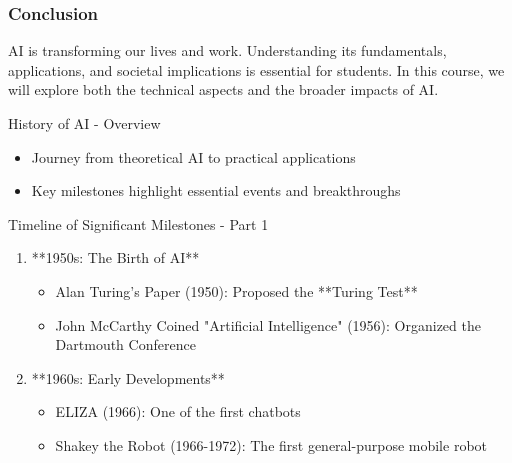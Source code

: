 \documentclass[aspectratio=169]{beamer}
\begin{document}
\begin{frame}[fragile]
    \frametitle{Conclusion}
    AI is transforming our lives and work. Understanding its fundamentals, applications, and societal implications is essential for students. In this course, we will explore both the technical aspects and the broader impacts of AI.
\end{frame}

\begin{frame}[fragile]{History of AI - Overview}
    \begin{itemize}
        \item Journey from theoretical AI to practical applications
        \item Key milestones highlight essential events and breakthroughs
    \end{itemize}
\end{frame}

\begin{frame}[fragile]{Timeline of Significant Milestones - Part 1}
    \begin{enumerate}
        \item **1950s: The Birth of AI**
            \begin{itemize}
                \item Alan Turing's Paper (1950): Proposed the **Turing Test**
                \item John McCarthy Coined "Artificial Intelligence" (1956): Organized the Dartmouth Conference
            \end{itemize}
        \item **1960s: Early Developments**
            \begin{itemize}
                \item ELIZA (1966): One of the first chatbots
                \item Shakey the Robot (1966-1972): The first general-purpose mobile robot
            \end{itemize}
    \end{enumerate}
\end{frame}
\end{document}
